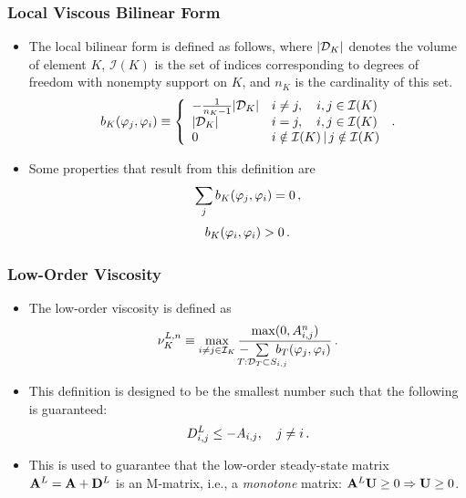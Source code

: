 \documentclass{beamer} \useoutertheme{infolines}
\begin{document}
\begin{frame}
\frametitle{Local Viscous Bilinear Form}

\begin{itemize}
   \item The local bilinear form is defined as follows, where $|\mathcal{D}_K|$ denotes
      the volume of element $K$, $\mathcal{I}(K)$ is the set of indices
      corresponding to degrees of freedom with nonempty support on $K$, and
      $n_K$ is the cardinality of this set.
   \begin{equation}
      b_K(\varphi_j, \varphi_i) \equiv \left\{\begin{array}{l l}
         -\frac{1}{n_K - 1}|\mathcal{D}_K| & i\ne j, \quad i,j\in \mathcal{I}(K)\\
         |\mathcal{D}_K|                   & i = j,  \quad i,j\in \mathcal{I}(K)\\
         0                & i\notin\mathcal{I}(K)\,|\, j\notin\mathcal{I}(K)
      \end{array}\right. \,.
   \end{equation}
   \item Some properties that result from this definition are
   \begin{equation}
      \sum\limits_j b_K(\varphi_j, \varphi_i) = 0 \,,
   \end{equation}
   \begin{equation}
      b_K(\varphi_i, \varphi_i) > 0 \,.
   \end{equation}
\end{itemize}

\end{frame}
\begin{frame}
\frametitle{Low-Order Viscosity}

\begin{itemize}
   \item The low-order viscosity is defined as
   \begin{equation}
     \lowordercellviscosity[\timeindex] \equiv \max\limits_{i\ne j\in\indicescell}
     \frac{\max(0,\ssmatrixletter\ij^\timeindex)}
     {-\mkern-20mu\sumKSij[T]\mkern-20mu\localviscbilinearform{T}{j}{i}}
     \eqp
   \end{equation}
   \item This definition is designed to be the smallest number such that the
      following is guaranteed:
   \begin{equation}
      D^L_{i,j} \leq -A_{i,j}, \quad j\ne i \,.
   \end{equation}
   \item This is used to guarantee that the low-order steady-state matrix
      $\ssmatrix^L=\ssmatrix+\diffusionmatrix^L$ is an M-matrix, i.e., a \emph{monotone} matrix:
      $\ssmatrix^L\solutionvector \ge 0\Rightarrow \solutionvector\ge 0$.
\end{itemize}

\end{frame}
\end{document}
